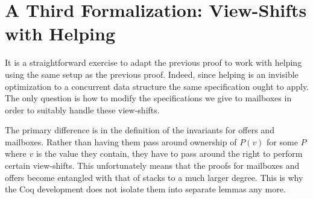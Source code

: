 \section{A Third Formalization: View-Shifts with Helping}

It is a straightforward exercise to adapt the previous proof to work
with helping using the same setup as the previous proof. Indeed, since
helping is an invisible optimization to a concurrent data structure
the same specification ought to apply. The only question is how to
modify the specifications we give to mailboxes in order to suitably
handle these view-shifts.

The primary difference is in the definition of the invariants for
offers and mailboxes. Rather than having them pass around ownership of
$P(v)$ for some $P$ where $v$ is the value they contain, they have to
pass around the right to perform certain view-shifts. This
unfortunately means that the proofs for mailboxes and offers become
entangled with that of stacks to a much larger degree. This is why the
Coq development does not isolate them into separate lemmas any
more.

